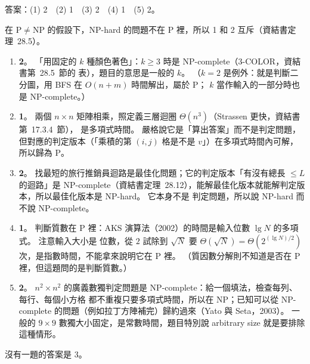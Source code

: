 \begin{pastsoln}
答案：(1) 2　(2) 1　(3) 2　(4) 1　(5) 2。

在 $\mathrm{P} \ne \mathrm{NP}$ 的假設下，NP-hard 的問題不在 P 裡，所以 1 和 2 互斥（資結書定理~28.5）。
\begin{enumerate}[label=(\arabic*)]
\item \textbf{2}。 「用固定的 $k$ 種顏色著色」：$k \ge 3$ 時是 NP-complete（$3$-COLOR，資結書第~28.5~節的
表），題目的意思是一般的 $k$。 （$k = 2$ 是例外：就是判斷二分圖，用 BFS 在 $O(n + m)$ 時間解出，屬於 P；
$k$ 當作輸入的一部分時也是 NP-complete。）
\item \textbf{1}。 兩個 $n \times n$ 矩陣相乘，照定義三層迴圈 $\Theta(n^3)$（Strassen 更快，資結書第~17.3.4~節），
是多項式時間。 嚴格說它是「算出答案」而不是判定問題，但對應的判定版本（「乘積的第 $(i, j)$ 格是不是
$v$」）在多項式時間內可解，所以歸為 P。
\item \textbf{2}。 找最短的旅行推銷員迴路是最佳化問題；它的判定版本「有沒有總長 $\le L$ 的迴路」是
NP-complete（資結書定理~28.12），能解最佳化版本就能解判定版本，所以最佳化版本是 NP-hard。 它本身不是
判定問題，所以說 NP-hard 而不說 NP-complete。
\item \textbf{1}。 判斷質數在 P 裡：AKS 演算法（2002）的時間是輸入位數 $\lg N$ 的多項式。 注意輸入大小是
位數，從 $2$ 試除到 $\sqrt{N}$ 要 $\Theta(\sqrt{N}) = \Theta(2^{(\lg N)/2})$ 次，是指數時間，不能拿來說明它在
P 裡。 （質因數分解則不知道是否在 P 裡，但這題問的是判斷質數。）
\item \textbf{2}。 $n^2 \times n^2$ 的廣義數獨判定問題是 NP-complete：給一個填法，檢查每列、每行、每個小方格
都不重複只要多項式時間，所以在 NP；已知可以從 NP-complete 的問題（例如拉丁方陣補完）歸約過來（Yato
與 Seta，2003）。 一般的 $9 \times 9$ 數獨大小固定，是常數時間，題目特別說 arbitrary size 就是要排除這種情形。
\end{enumerate}
沒有一題的答案是 3。
\end{pastsoln}
